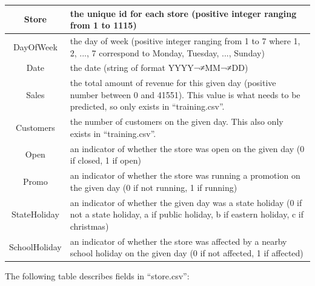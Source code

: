 \documentclass[letterpaper,twocolumn,11pt]{article}
\begin{document}
\begin{tabular}{| c | L{5cm} |}
  \hline
  Store & the unique id for each store (positive integer ranging from 1 to 1115) \\ \hline
  DayOfWeek & the day of week (positive integer ranging from 1 to 7 where 1, 2, ..., 7 correspond to Monday, Tuesday, ..., Sunday) \\ \hline
  Date & the date (string of format YYYY¬≠MM¬≠DD) \\ \hline
  Sales & the total amount of revenue for this given day (positive number between 0 and 41551). This value is what needs to be predicted, so only exists in ``training.csv''. \\ \hline
  Customers & the number of customers on the given day. This also only exists in ``training.csv''. \\ \hline
  Open & an indicator of whether the store was open on the given day (0 if closed, 1 if open) \\ \hline
  Promo & an indicator of whether the store was running a promotion on the given day (0 if not running, 1 if running) \\ \hline
  StateHoliday & an indicator of whether the given day was a state holiday (0 if not a state holiday, a if public holiday, b if eastern holiday, c if christmas) \\ \hline
  SchoolHoliday & an indicator of whether the store was affected by a nearby school holiday on the given day (0 if not affected, 1 if affected) \\ \hline
\end{tabular}


\newpage
The following table describes fields in ``store.csv'':
\end{document}
